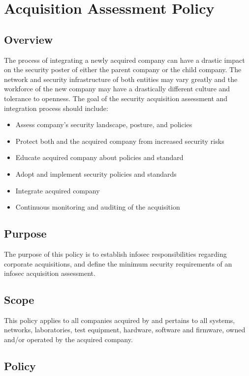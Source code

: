 \chapter{Acquisition Assessment Policy}\label{NS:AAP}
\CommonIntroduction
\section{Overview}
The process of integrating a newly acquired company can have a drastic impact on the security poster of either the parent company or the child company.  
The network and security infrastructure of both entities may vary greatly and the workforce of the new company may have a drastically different culture and tolerance to openness.  
The goal of the security acquisition assessment and integration process should include:
\begin{itemize}
\item
Assess company's security landscape, posture, and policies
\item
Protect both \CompanyName{} and the acquired company from increased security risks
\item 
Educate acquired company about \CompanyName{} policies and standard
\item
Adopt and implement \CompanyName{} security policies and standards
\item
Integrate acquired company
\item
Continuous monitoring and auditing of the acquisition
\end{itemize}
\section{Purpose}
The purpose of this policy is to establish \gls{infosec} responsibilities regarding corporate acquisitions, and define the minimum security requirements of an \gls{infosec} acquisition assessment.
\section{Scope}
This policy applies to all companies acquired by \CompanyName{} and pertains to all systems, networks, laboratories, test equipment, hardware, software and firmware, owned and/or operated by the acquired company.
\section{Policy}
